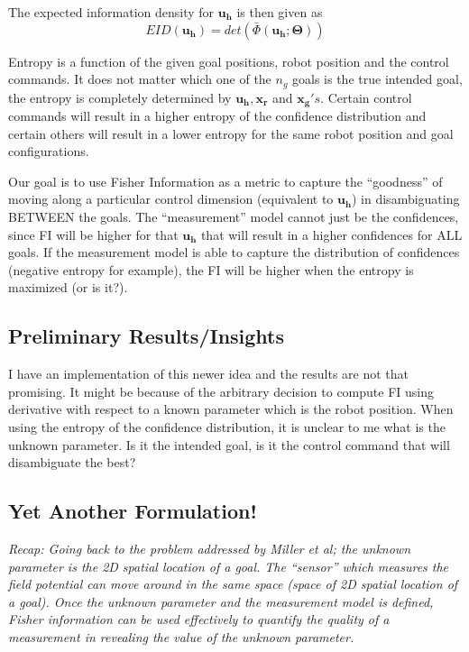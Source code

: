 \documentclass[]{article}
\begin{document}
The expected information density for $\boldsymbol{u_h}$ is then given as 
\begin{equation*}
EID(\boldsymbol{u_h}) = det(\bar{\Phi}(\boldsymbol{u_h};\boldsymbol{\Theta}))
\end{equation*}

Entropy is a function of the given goal positions, robot position and the control commands. It does not matter which one of the $n_g$ goals is the true intended goal, the entropy is completely determined by $\boldsymbol{u_h}, \boldsymbol{x_r}$ and $\boldsymbol{x_{g}}'s$. Certain control commands will result in a higher entropy of the confidence distribution and certain others will result in a lower entropy for the same robot position and goal configurations. 

Our goal is to use Fisher Information as a metric to capture the ``goodness'' of moving along a particular control dimension (equivalent to $\boldsymbol{u_h}$) in disambiguating BETWEEN the goals. The ``measurement'' model cannot just be the confidences, since FI will be higher for that $\boldsymbol{u_h}$ that will result in a higher confidences for ALL goals. If the measurement model is able to capture the distribution of confidences (negative entropy for example), the FI will be higher when the entropy is maximized (or is it?).

\subsection*{Preliminary Results/Insights}

I have an implementation of this newer idea and the results are not that promising. It might be because of the arbitrary decision to compute FI using derivative with respect to a known parameter which is the robot position. When using the entropy of the confidence distribution, it is unclear to me what is the unknown parameter. Is it the intended goal, is it the control command that will disambiguate the best? 

\pagebreak
\subsection*{Yet Another Formulation!}

\textit{Recap: Going back to the problem addressed by Miller et al; the unknown parameter is the 2D spatial location of a goal. The ``sensor'' which measures the field potential can move around in the same space (space of 2D spatial location of a goal). Once the unknown parameter and the measurement model is defined, Fisher information can be used effectively to quantify the quality of a measurement in revealing the value of the unknown parameter.} 
\end{document}
